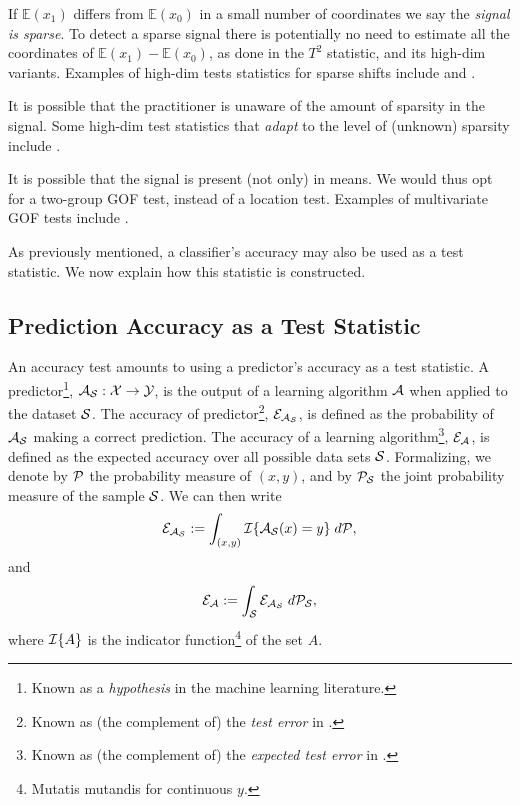 \documentclass[onecolumn,draftclsnofoot]{IEEEtran}
\begin{document}
If $\mathbb{E}(x_1)$ differs from $\mathbb{E}(x_0)$ in a small number of coordinates we say the \emph{signal is sparse}.
To detect a sparse signal there is potentially no need to estimate all the coordinates of $\mathbb{E}(x_1)-\mathbb{E}(x_0)$, as done in the $T^2$ statistic, and its high-dim variants. 
Examples of high-dim tests statistics for sparse shifts include \cite{cai_two-sample_2013} and \cite{chang2014simulation}.

It is possible that the practitioner is unaware of the amount of sparsity in the signal. 
Some high-dim test statistics that \emph{adapt} to the level of (unknown) sparsity include \cite{simes1986improved,donoho2004higher,zhong2013tests,shen2015adaptive,moscovich2016exact}.

It is possible that the signal is present (not only) in means. 
We would thus opt for a two-group GOF test, instead of a location test. 
Examples of multivariate GOF tests include \cite{bickel1969distribution,friedman1979multivariate,hall2002permutation,szekely2004testing,Biau2005,Rosenbaum2005,eric2008testing,perez2009estimation,vayatis_auc_2009,gretton_kernel_2012-1}.

As previously mentioned, a classifier's accuracy may also be used as a test statistic. We now explain how this statistic is constructed. 


\subsection{Prediction Accuracy as a Test Statistic}
An accuracy test amounts to using a predictor's accuracy as a test statistic.  
A predictor\footnote{Known as a \emph{hypothesis} in the machine learning literature.}, $\mathcal{A}_{\mathcal{S}}:\mathcal{X} \to \mathcal{Y}$, is the output of a learning algorithm $\mathcal{A}$ when applied to the dataset $\mathcal{S}$. 
The accuracy of predictor\footnote{Known as (the complement of) the \emph{test error} in \cite{hastie_elements_2003}.}, $\mathcal{E}_{\mathcal{A}_{\mathcal{S}}}$, is defined as the probability of $\mathcal{A}_{\mathcal{S}}$ making a correct prediction. 
The accuracy of a learning algorithm\footnote{Known as (the complement of) the \emph{expected test error} in \cite{hastie_elements_2003}.}, $\mathcal{E}_{\mathcal{A}}$, is defined as the expected accuracy over all possible data sets $\mathcal{S}$. 
Formalizing, we denote by $\mathcal{P}$ the probability measure of $(x, y)$, and by $\mathcal{P}_{\mathcal{S}}$ the joint probability measure of the sample $\mathcal{S}$. 
We can then write 
\begin{align}
\mathcal{E}_{\mathcal{A}_{\mathcal{S}}}:=\int_{(x,y)} \mathcal{I}{\{ \mathcal{A}_{\mathcal{S}}(x)=y \}} \; d\mathcal{P},
\end{align}
and
\begin{align}
\mathcal{E}_{\mathcal{A}}:=\int_{\mathcal{S}} \mathcal{E}_{\mathcal{A}_{\mathcal{S}}} \; d\mathcal{P}_{\mathcal{S}},
\end{align}
where $\mathcal{I}{\{ A \}}$ is the indicator function\footnote{Mutatis mutandis for continuous $y$.} of the set $A$. 
\end{document}
